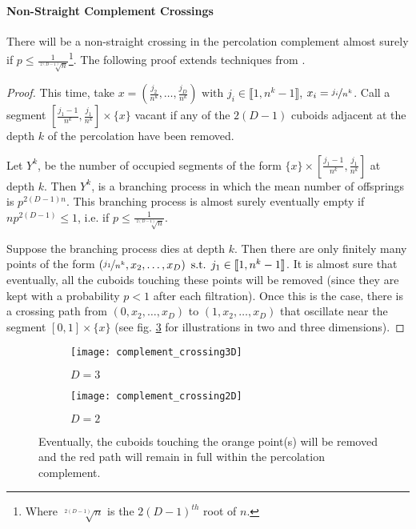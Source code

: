 
\paragraph{Non-Straight Complement Crossings}
There will be a non-straight crossing in the percolation complement almost surely if $p \leq \frac{1}{\sqrt[2(D-1)]{n}}$\footnote{Where $\sqrt[2(D-1)]{n}$ is the $2(D-1)^{th}$ root of $n$.}.
The following proof extends techniques from \cite[p.310 b.(2)]{Chayes_1988}.
\begin{proof}\label{prf:nonStraightComplementCrossigs}
	This time, take $x = \left( \frac{j_2}{n^k},\dots,\frac{j_D}{n^k} \right) \text{ with } j_i \in \llbracket 1,n^k-1 \rrbracket$, $x_i = \nicefrac{j_i}{n^k}$.
	Call a segment $\left[ \frac{j_1-1}{n^k},\frac{j_1}{n^k} \right] \times \{ x \}$ vacant if any of the $2(D-1)$ cuboids adjacent at the depth $k$ of the percolation have been removed.
	
	Let $Y^k$, be the number of occupied segments of the form $\{ x \} \times \left[ \frac{j_1-1}{n^k},\frac{j_1}{n^k} \right]$ at depth $k$.
	Then $Y^k$, is a branching process in which the mean number of offsprings is $p^{2(D-1)n}$.
	This branching process is almost surely eventually empty if $np^{2(D-1)} \leq 1$, i.e. if $p \leq \frac{1}{\sqrt[2(D-1)]{n}}$.
	
	Suppose the branching process dies at depth $k$.
	Then there are only finitely many points of the form $\left( \nicefrac{j_1}{n^k}, x_2,\dots,x_D \right) \text{ s.t. } j_1 \in \llbracket 1,n^k-1 \rrbracket$.
	It is almost sure that eventually, all the cuboids touching these points will be removed (since they are kept with a probability $p<1$ after each filtration).
	Once this is the case, there is a crossing path from $\left( 0, x_2,\dots,x_D \right)$ to $\left( 1, x_2,\dots,x_D \right)$ that oscillate near the segment $\left[ 0,1 \right] \times \{ x \}$ (see fig. \ref{fig:complementCrossing} for illustrations in two and three dimensions).
\end{proof}

\begin{figure}[!h]
	\vspace{-0.75cm}
	\begin{subfigure}{0.44\linewidth}
		\texttt{[image: complement\_crossing3D]}
		\centering
		\captionsetup{justification=centering}
		\caption{$D = 3$}
		\label{fig:complementCrossing3D}
	\end{subfigure}
	\hspace{0.1\linewidth}
	\begin{subfigure}{0.44\linewidth}
		\texttt{[image: complement\_crossing2D]}
		\centering
		\captionsetup{justification=centering}
		\caption{$D = 2$}
		\label{fig:complementCrossing2D}
	\end{subfigure}
	\centering
	\caption{Eventually, the cuboids touching the orange point(s) will be removed and the red path will remain in full within the percolation complement.}
	\label{fig:complementCrossing}
\end{figure}

